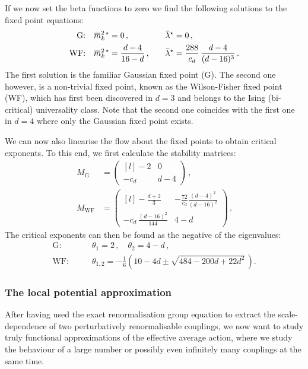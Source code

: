 \documentclass[11pt]{book}
\newcommand{\overbar}[1]{\mkern 1.5mu\overline{\mkern-1.5mu#1\mkern-1.5mu}\mkern 1.5mu}
\numberwithin{equation}{chapter}
\begin{document}
If we now set the beta functions to zero we find the following solutions
to the fixed point equations:
\begin{alignat}{2}
  \text{G:} \quad &\overbar m_k^{2 \, \star} = 0 \,, \quad
  &&\overbar \lambda^\star = 0 \,, \\
  \text{WF:} \quad &\overbar m_k^{2 \, \star} = \frac{ d - 4 }{ 16 - d } \,, \quad
  &&\overbar \lambda^\star =  \frac{ 288 }{ c_d } \, \frac{ d - 4 }{ (d - 16)^3 } \,.
\end{alignat}
The first solution is the familiar Gaussian fixed point (G). The second one however,
is a non-trivial fixed point, known as the Wilson-Fisher fixed point (WF),
which has first been discovered in $d=3$ and belongs to the Ising (bi-critical)
universality class.
Note that the second
one coincides with the first one in $d=4$ where only the Gaussian fixed point exists.

We can now also linearise the flow about the fixed points
to obtain critical exponents. To this end, we first calculate the stability
matrices:
\begin{align}
  M_{\mathrm{G}} &=
  \begin{pmatrix*}[l]
    -2    & 0 \\
    -c_d  & d - 4
  \end{pmatrix*} \,, \\
  M_{\mathrm{WF}} &=
  \begin{pmatrix*}[l]
    -\frac{d+2}{3}                & -\frac{72}{c_d} \frac{ (d-4)^2 }{ (d-16)^2 }  \\
    -c_d \, \frac{(d-16)^2}{144}  & 4 - d
  \end{pmatrix*} \,.
\end{align}
The critical exponents can then be found as the negative of the eigenvalues:
\begin{align}
  \text{G:}&
  \qquad
  \theta_1 = 2 \,,
  \quad
  \theta_2 = 4 - d \,, \\
  \text{WF:}&
  \qquad
  \theta_{1,2} = - \frac 16 \left( 10 - 4d \pm \sqrt{ 484 - 200 d + 22 d^2 } \, \right) .
  \label{eq:critexpperttheory}
\end{align}

\subsubsection{The local potential approximation}

After having used the exact renormalisation group equation
to extract the scale-dependence of two perturbatively
renormalisable couplings, we now want to study truly functional
approximations of the effective average action, where we study the
behaviour of a large number or possibly even infinitely many couplings
at the same time.
\end{document}

